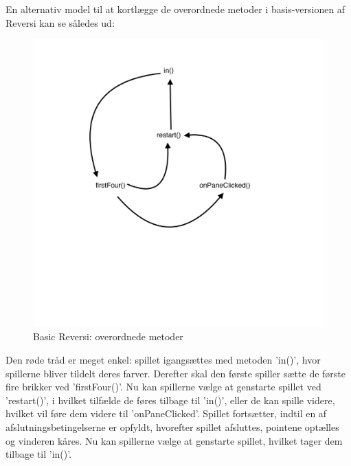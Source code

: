 En alternativ model til at kortlægge de overordnede metoder i basis-versionen af Reversi kan se således ud:
\begin{figure}[H]
    \centering
    \caption{Basic Reversi: overordnede metoder}\label{BRF}
    \includegraphics[width=1\textwidth]{Graphics/Basis.png}
\end{figure}
Den røde tråd er meget enkel: spillet igangsættes med metoden 'in()', hvor spillerne bliver tildelt deres farver. Derefter skal den første spiller sætte de første fire brikker ved 'firstFour()'. Nu kan spillerne vælge at genstarte spillet ved 'restart()', i hvilket tilfælde de føres tilbage til 'in()', eller de kan spille videre, hvilket vil føre dem videre til 'onPaneClicked'. Spillet fortsætter, indtil en af afslutningsbetingelserne er opfyldt, hvorefter spillet afsluttes, pointene optælles og vinderen kåres. Nu kan spillerne vælge at genstarte spillet, hvilket tager dem tilbage til 'in()'.

